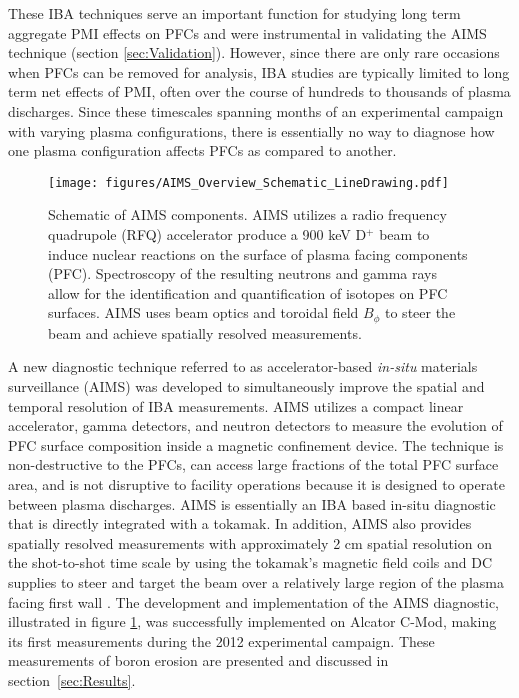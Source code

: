\documentclass[final,3p,times,twocolumn]{elsarticle}
\begin{document}
These IBA techniques serve an important function for studying long term aggregate PMI effects on PFCs \cite{wright2011plasma} and were instrumental in validating the AIMS technique (section \ref{sec:Validation}). However, since there are only rare occasions when PFCs can be removed for analysis, IBA studies are typically limited to long term net effects of PMI, often over the course of hundreds to thousands of plasma discharges.  Since these timescales spanning months of an experimental campaign with varying plasma configurations, there is essentially no way to diagnose how one plasma configuration affects PFCs as compared to another.

\begin{figure}[h]
 \centering
  \texttt{[image: figures/AIMS\_Overview\_Schematic\_LineDrawing.pdf]}
 \caption{Schematic of AIMS components.  AIMS utilizes a radio frequency quadrupole (RFQ) accelerator produce a 900 keV D$^+$ beam to induce nuclear reactions on the surface of plasma facing components (PFC). Spectroscopy of the resulting neutrons and gamma rays allow for the identification and quantification of isotopes on PFC surfaces. AIMS uses beam optics and toroidal field $B_\phi$ to steer the beam and achieve spatially resolved measurements.}
 \label{fig:AIMSOverviewSchematic0}
\end{figure}

A new diagnostic technique referred to as accelerator-based \textit{in-situ} materials surveillance (AIMS) was developed to simultaneously improve the spatial and temporal resolution of IBA measurements. AIMS utilizes a compact linear accelerator, gamma detectors, and neutron detectors to measure the evolution of PFC surface composition inside a magnetic confinement device. The technique is non-destructive to the PFCs, can access large fractions of the total PFC surface area, and is not disruptive to facility operations because it is designed to operate between plasma discharges. AIMS is essentially an IBA based in-situ diagnostic that is directly integrated with a tokamak. In addition, AIMS also provides spatially resolved measurements with approximately 2 cm spatial resolution on the shot-to-shot time scale by using the tokamak's magnetic field coils and DC supplies to steer and target the beam over a relatively large region of the plasma facing first wall \cite{RSIPaper}.  The development and implementation of the AIMS diagnostic, illustrated in figure \ref{fig:AIMSOverviewSchematic0}, was successfully implemented on Alcator C-Mod, making its first measurements during the 2012 experimental campaign. These measurements of boron erosion are presented and discussed in section~\ref{sec:Results}.
\end{document}
